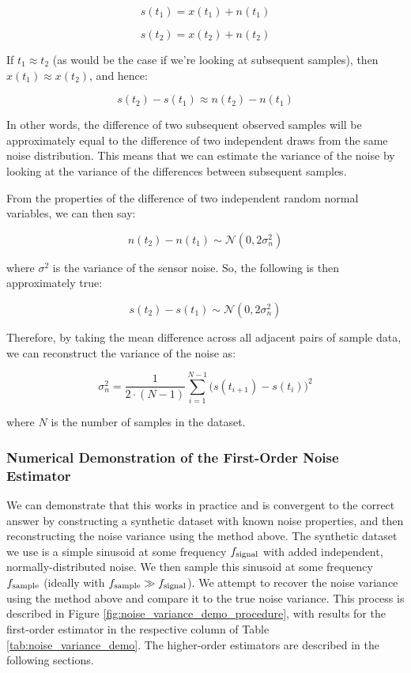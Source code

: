 \documentclass[conf]{new-aiaa}
\begin{document}
    $$s(t_1) = x(t_1) + n(t_1)$$

    $$s(t_2) = x(t_2) + n(t_2)$$

    \noindent If $t_1 \approx t_2$ (as would be the case if we're looking at subsequent samples), then $x(t_1) \approx x(t_2)$, and hence:

    $$s(t_2) - s(t_1) \approx n(t_2) - n(t_1)$$

    In other words, the difference of two subsequent observed samples will be approximately equal to the difference of two independent draws from the same noise distribution. This means that we can estimate the variance of the noise by looking at the variance of the differences between subsequent samples.

    From the properties of the difference of two independent random normal variables, we can then say:

    $$n(t_2) - n(t_1) \sim \mathcal{N}(0, 2\sigma^2_n)$$

    \noindent where $\sigma^2$ is the variance of the sensor noise. So, the following is then approximately true:

    $$s(t_2) - s(t_1) \sim \mathcal{N}(0, 2\sigma^2_n)$$

    Therefore, by taking the mean difference across all adjacent pairs of sample data, we can reconstruct the variance of the noise as:

    \begin{equation}
        \sigma^2_n = \frac{1}{2 \cdot (N-1)} \sum_{i=1}^{N-1} \Big( s(t_{i+1}) - s(t_i) \Big)^2
        \label{eq:1st_order_noise_estimator}
    \end{equation}

    \noindent where $N$ is the number of samples in the dataset.

    \subsubsection{Numerical Demonstration of the First-Order Noise Estimator}

    We can demonstrate that this works in practice and is convergent to the correct answer by constructing a synthetic dataset with known noise properties, and then reconstructing the noise variance using the method above. The synthetic dataset we use is a simple sinusoid at some frequency $f_{\rm signal}$ with added independent, normally-distributed noise. We then sample this sinusoid at some frequency $f_{\rm sample}$ (ideally with $f_{\rm sample} \gg f_{\rm signal}$). We attempt to recover the noise variance using the method above and compare it to the true noise variance. This process is described in Figure \ref{fig:noise_variance_demo_procedure}, with results for the first-order estimator in the respective column of Table \ref{tab:noise_variance_demo}. The higher-order estimators are described in the following sections.
\end{document}
